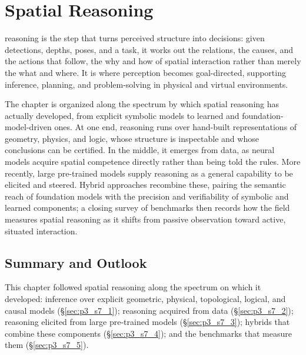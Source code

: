 \chapter{Spatial Reasoning}
\label{sec:reasoning}

 reasoning is the step that turns perceived structure into decisions: given detections, depths, poses, and a task, it works out the relations, the causes, and the actions that follow, the why and how of spatial interaction rather than merely the what and where. It is where perception becomes goal-directed, supporting inference, planning, and problem-solving in physical and virtual environments.

The chapter is organized along the spectrum by which spatial reasoning has actually developed, from explicit symbolic models to learned and foundation-model-driven ones. At one end, reasoning runs over hand-built representations of geometry, physics, and logic, whose structure is inspectable and whose conclusions can be certified. In the middle, it emerges from data, as neural models acquire spatial competence directly rather than being told the rules. More recently, large pre-trained models supply reasoning as a general capability to be elicited and steered. Hybrid approaches recombine these, pairing the semantic reach of foundation models with the precision and verifiability of symbolic and learned components; a closing survey of benchmarks then records how the field measures spatial reasoning as it shifts from passive observation toward active, situated interaction.








\section{Summary and Outlook}
\label{sec:p3_s7_6}

This chapter followed spatial reasoning along the spectrum on which it developed: inference over explicit geometric, physical, topological, logical, and causal models (§\ref{sec:p3_s7_1}); reasoning acquired from data (§\ref{sec:p3_s7_2}); reasoning elicited from large pre-trained models (§\ref{sec:p3_s7_3}); hybrids that combine these components (§\ref{sec:p3_s7_4}); and the benchmarks that measure them (§\ref{sec:p3_s7_5}).

